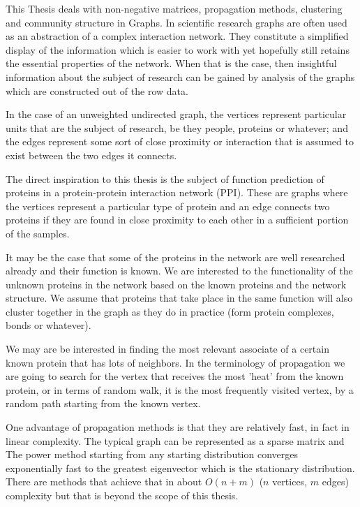 \documentclass[a4paper,10pt]{article}
\theoremstyle{definition}
\theoremstyle{remark}
\theoremstyle{plain}
\begin{document}

This Thesis deals with non-negative matrices, propagation methods, clustering
and community structure in Graphs. In scientific research graphs are often used
as an abstraction of a complex interaction network. They constitute a simplified
display of the information which is easier to work with yet hopefully still
retains the essential properties of the network. When that is the case, then
insightful information about the subject of research can be gained by analysis
of the graphs which are constructed out of the row data.

In the case of an unweighted undirected graph, the vertices represent particular
units that are the subject of research, be they people, proteins or whatever;
and the edges represent some sort of close proximity or interaction that is
assumed to exist between the two edges it connects.

The direct inspiration to this thesis is the subject of function prediction 
of proteins in a protein-protein interaction network (PPI). These are graphs
where the vertices represent a particular type of protein and an edge connects
two proteins if they are found in close proximity to each other in a sufficient
portion of the samples. 

It may be the case that some of the proteins in the network are well researched
already and their function is known. We are interested to the functionality of
the unknown proteins in the network based on the known proteins and the network
structure. We assume that proteins that take place in the same function will
also cluster together in the graph as they do in practice (form protein
complexes, bonds or whatever).

We may are be interested in finding the most relevant associate of a certain
known protein that has lots of neighbors. In the terminology of propagation we
are going to search for the vertex that receives the most 'heat' from the known
protein, or in terms of random walk, it is the most frequently visited vertex,
by a random path starting from the known vertex.

One advantage of propagation methods is that they are relatively fast, in fact
in linear complexity. The typical graph can be represented as a sparse matrix
and The power method starting from any starting distribution converges
exponentially fast to the greatest eigenvector which is the stationary
distribution. There are methods that achieve that in about $O(n + m)$  ($n$
vertices, $m$ edges) complexity but that is beyond the scope of this thesis.
\end{document}
